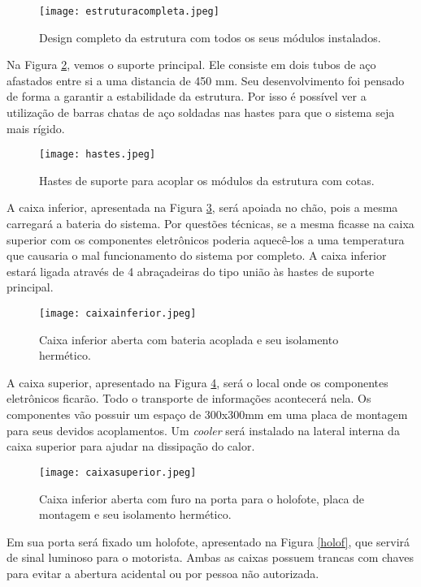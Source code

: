 \begin{figure}[h]
	\centering
    \texttt{[image: estruturacompleta.jpeg]}
    \caption{Design completo da estrutura com todos os seus módulos instalados.}
    \label{estrucomp}
\end{figure}


Na Figura \ref{hastes}, vemos o suporte principal. Ele consiste em dois tubos de aço afastados entre si a uma distancia de 450 mm. Seu desenvolvimento foi pensado de forma a garantir a estabilidade da estrutura. Por isso é possível ver a utilização de barras chatas de aço soldadas nas hastes para que o sistema seja mais rígido.
\newpage
\begin{figure}[h]
	\centering
    \texttt{[image: hastes.jpeg]}
    \caption{Hastes de suporte para acoplar os módulos da estrutura com cotas.}
    \label{hastes}
\end{figure}


A caixa inferior, apresentada na Figura \ref{caixainf}, será apoiada no chão, pois a mesma carregará a bateria do sistema. Por questões técnicas, se a mesma ficasse na caixa superior com os componentes eletrônicos poderia aquecê-los a uma temperatura que causaria o mal funcionamento do sistema por completo. A caixa inferior estará ligada através de 4 abraçadeiras do tipo união às hastes de suporte principal.

\begin{figure}[h]
	\centering
    \texttt{[image: caixainferior.jpeg]}
    \caption{Caixa inferior aberta com bateria acoplada e seu isolamento hermético.}
    \label{caixainf}
\end{figure}

A caixa superior, apresentado na Figura \ref{caixasup}, será o local onde os componentes eletrônicos ficarão. Todo o transporte de informações acontecerá nela. Os componentes vão possuir um espaço de 300x300mm em uma placa de montagem para seus devidos acoplamentos. Um \textit{cooler} será instalado na lateral interna da caixa superior para ajudar na dissipação do calor. 

\begin{figure}[h]
	\centering
    \texttt{[image: caixasuperior.jpeg]}
    \caption{Caixa inferior aberta com furo na porta para o holofote, placa de montagem e seu isolamento hermético.}
    \label{caixasup}
\end{figure}

Em sua porta será fixado um holofote, apresentado na Figura \ref{holof}, que servirá de sinal luminoso para o motorista. Ambas as caixas possuem trancas com chaves para evitar a abertura acidental ou por pessoa não autorizada.

